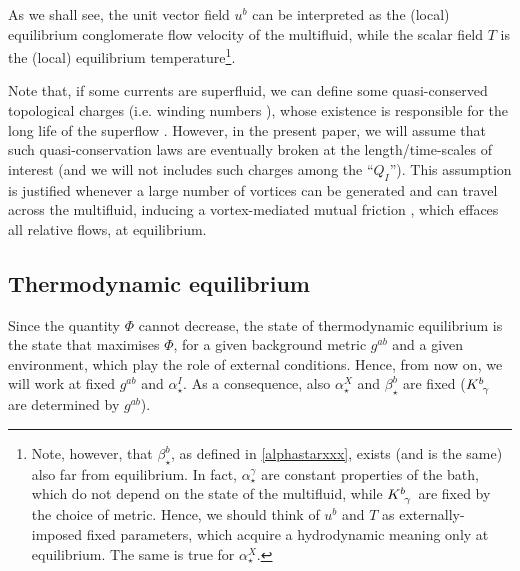 \documentclass[a4paper, amsfonts, amssymb, amsmath, reprint, showkeys, nofootinbib, twoside, onecolumn,notitlepage]{revtex4-1}
\theoremstyle{definition}
\theoremstyle{theorem}
\begin{document}
As we shall see, the unit vector field $u^b$ can be interpreted as the (local) equilibrium conglomerate flow velocity of the multifluid, while the scalar field $T$ is the (local) equilibrium temperature\footnote{Note, however, that $\beta^b_\star$, as defined in \eqref{alphastarxxx}, exists (and is the same) also far from equilibrium. In fact, $\alpha_\star^\gamma$ are constant properties of the bath, which do not depend on the state of the multifluid, while $K\indices{^b _\gamma}$ are fixed by the choice of metric. Hence, we should think of $u^b$ and $T$ as externally-imposed fixed parameters, which acquire a hydrodynamic meaning only at equilibrium. The same is true for $\alpha_\star^X$.}. 

Note that, if some currents are superfluid, we can define some quasi-conserved topological charges (i.e. winding numbers \cite{Termo}), whose existence is responsible for the long life of the superflow \cite{AndreevMelnikovski2004,GavassinoKhalatnikov2021}. However, in the present paper, we will assume that such quasi-conservation laws are eventually broken at the length/time-scales of interest (and we will not includes such charges among the ``$Q_I$''). This assumption is justified whenever a large number of vortices can be generated and can travel across the multifluid, inducing a vortex-mediated mutual friction \cite{langlois98,GavassinoIordanskii2021}, which effaces all relative flows, at equilibrium.



\subsection{Thermodynamic equilibrium}\label{Thermodynamicequilibrium}

Since the quantity $\Phi$ cannot decrease, the state of thermodynamic equilibrium is the state that maximises $\Phi$, for a given background metric $g^{ab}$ and a given environment, which play the role of external conditions. Hence, from now on, we will work at fixed $g^{ab}$ and $\alpha_\star^I$. As a consequence, also $\alpha_\star^X$ and $\beta_\star^b$ are fixed ($K\indices{^b _\gamma}$ are determined by $g^{ab}$). 
\end{document}
